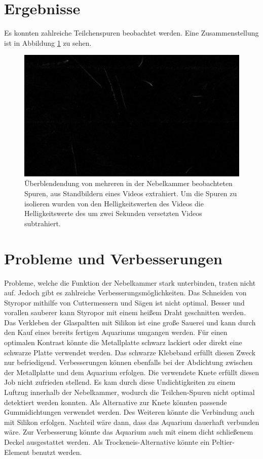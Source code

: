 \section{Ergebnisse}
Es konnten zahlreiche Teilchenspuren beobachtet werden. Eine Zusammenstellung ist in Abbildung \ref{fig:nebelkammer} zu sehen.
\begin{figure}
  \centering
  \includegraphics[width=\linewidth]{images/nebelkammer.png}
  \caption{Überblendendung von mehreren in der Nebelkammer beobachteten Spuren, aus Standbildern eines Videos extrahiert. Um die Spuren zu isolieren wurden von den Helligkeitswerten des Videos die Helligkeitswerte des um zwei Sekunden versetzten Videos subtrahiert.}
  \label{fig:nebelkammer}
\end{figure}


\section{Probleme und Verbesserungen}
Probleme, welche die Funktion der Nebelkammer stark unterbinden, traten nicht
auf. Jedoch gibt es zahlreiche Verbesserungsmöglichkeiten. Das Schneiden von
Styropor mithilfe von Cuttermessern und Sägen ist nicht optimal. Besser und
vorallen sauberer kann Styropor mit einem heißem Draht geschnitten werden. Das
Verkleben der Glaspaltten mit Silikon ist eine große Sauerei und kann durch den
Kauf eines bereits fertigen Aquariums umgangen werden. Für einen optimalen
Kontrast könnte die Metallplatte schwarz lackiert oder direkt eine schwarze
Platte verwendet werden. Das schwarze Klebeband erfüllt diesen Zweck nur
befriedigend. Verbesserungen können ebenfalls bei der Abdichtung zwischen der
Metallplatte und dem Aquarium erfolgen. Die verwendete Knete erfüllt diesen Job
nicht zufrieden stellend. Es kam durch diese Undichtigkeiten zu einem Luftzug
innerhalb der Nebelkammer, wodurch die Teilchen-Spuren nicht optimal detektiert
werden konnten. Als Alternative zur Knete könnten passende Gummidichtungen
verwendet werden. Des Weiteren könnte die Verbindung auch mit Silikon erfolgen.
Nachteil wäre dann, dass das Aquarium dauerhaft verbunden wäre. Zur Verbesserung
könnte das Aquarium auch mit einem dicht schließenem Deckel ausgestattet werden.
Als Trockeneis-Alternative könnte ein Peltier-Element benutzt werden.


